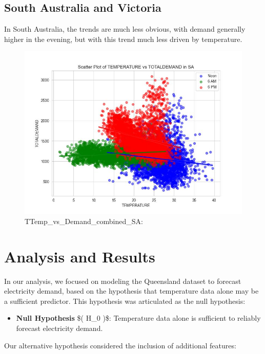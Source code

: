 \documentclass[
]{article}
\providecommand{\tightlist}{%
  \setlength{\itemsep}{0pt}\setlength{\parskip}{0pt}}
\begin{document}
\subsection{South Australia and
Victoria}\label{south-australia-and-victoria}

In South Australia, the trends are much less obvious, with demand
generally higher in the evening, but with this trend much less driven by
temperature.

\begin{figure}
\centering
\includegraphics{img/Temp_vs_Demand_combined_SA.jpg}
\caption{TTemp\_vs\_Demand\_combined\_SA:}
\end{figure}

\section{Analysis and Results}\label{analysis-and-results}

In our analysis, we focused on modeling the Queensland dataset to
forecast electricity demand, based on the hypothesis that temperature
data alone may be a sufficient predictor. This hypothesis was
articulated as the null hypothesis:

\begin{itemize}
\tightlist
\item
  \textbf{Null Hypothesis} \$( H\_0 )\$: Temperature data alone is
  sufficient to reliably forecast electricity demand.
\end{itemize}

Our alternative hypothesis considered the inclusion of additional
features:
\end{document}

